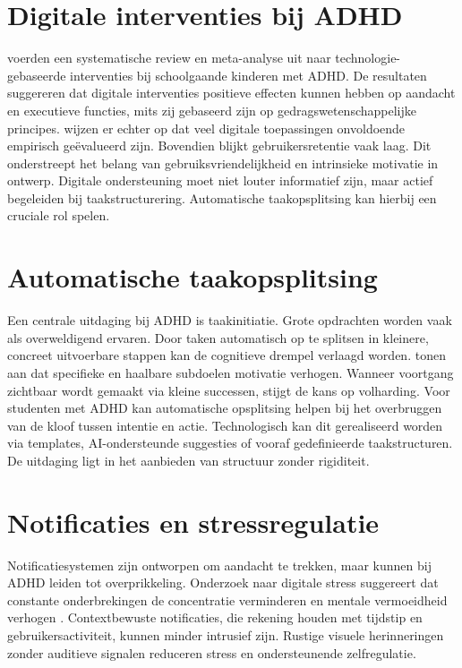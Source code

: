 \section{Digitale interventies bij ADHD}
\textcite{Cortese2023} voerden een systematische review en meta-analyse uit naar technologie-gebaseerde interventies bij schoolgaande kinderen met ADHD. De resultaten suggereren dat digitale interventies positieve effecten kunnen hebben op aandacht en executieve functies, mits zij gebaseerd zijn op gedragswetenschappelijke principes. \textcite{Hollis2025} wijzen er echter op dat veel digitale toepassingen onvoldoende empirisch geëvalueerd zijn. Bovendien blijkt gebruikersretentie vaak laag. Dit onderstreept het belang van gebruiksvriendelijkheid en intrinsieke motivatie in ontwerp. Digitale ondersteuning moet niet louter informatief zijn, maar actief begeleiden bij taakstructurering. Automatische taakopsplitsing kan hierbij een cruciale rol spelen.

\section{Automatische taakopsplitsing}
Een centrale uitdaging bij ADHD is taakinitiatie. Grote opdrachten worden vaak als overweldigend ervaren. Door taken automatisch op te splitsen in kleinere, concreet uitvoerbare stappen kan de cognitieve drempel verlaagd worden. \textcite{Locke2002} tonen aan dat specifieke en haalbare subdoelen motivatie verhogen. Wanneer voortgang zichtbaar wordt gemaakt via kleine successen, stijgt de kans op volharding. Voor studenten met ADHD kan automatische opsplitsing helpen bij het overbruggen van de kloof tussen intentie en actie. Technologisch kan dit gerealiseerd worden via templates, AI-ondersteunde suggesties of vooraf gedefinieerde taakstructuren. De uitdaging ligt in het aanbieden van structuur zonder rigiditeit.

\section{Notificaties en stressregulatie}
Notificatiesystemen zijn ontworpen om aandacht te trekken, maar kunnen bij ADHD leiden tot overprikkeling. Onderzoek naar digitale stress suggereert dat constante onderbrekingen de concentratie verminderen en mentale vermoeidheid verhogen \autocite{Mark2008}. Contextbewuste notificaties, die rekening houden met tijdstip en gebruikersactiviteit, kunnen minder intrusief zijn. Rustige visuele herinneringen zonder auditieve signalen reduceren stress en ondersteunende zelfregulatie.

